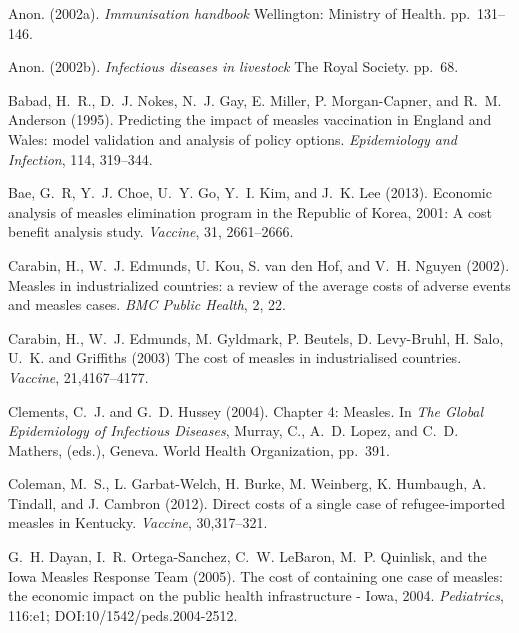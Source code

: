 \documentclass{article}
\begin{document}
\begin{itemize}
\begin{thebibliography}{}
Anon. (2002a).
\newblock \emph{Immunisation handbook}
\newblock Wellington: Ministry of Health. pp.~131--146.

Anon. (2002b).
\newblock \emph{Infectious diseases in livestock}
\newblock The Royal Society. pp.~68.

Babad, H.~R., D.~J. Nokes, N.~J. Gay, E. Miller, P. Morgan-Capner, and R.~M. Anderson (1995).
\newblock Predicting the impact of measles vaccination in England and Wales: model validation and analysis of policy options.
\newblock \emph{Epidemiology and Infection}, 114, 319--344.

Bae, G.~R, Y.~J. Choe, U.~Y. Go, Y.~I. Kim, and J.~K. Lee (2013). 
\newblock Economic analysis of measles elimination program in the Republic of Korea, 2001: A cost benefit analysis study.
\newblock \emph {Vaccine}, 31, 2661--2666.

Carabin, H., W.~J. Edmunds, U. Kou, S. van den Hof, and V.~H. Nguyen (2002). 
\newblock Measles in industrialized countries: a review of the average costs of adverse events and measles cases.
\newblock \emph{BMC Public Health}, 2, 22.

Carabin, H., W.~J. Edmunds, M. Gyldmark, P. Beutels, D. Levy-Bruhl, H. Salo, U.~K. and Griffiths (2003)
\newblock The cost of measles in industrialised countries.
\newblock \emph{Vaccine}, 21,4167--4177.

Clements, C.~J. and G.~D. Hussey (2004).
\newblock Chapter 4: Measles.
\newblock In \emph{The Global Epidemiology of Infectious Diseases},  Murray, C., A.~D. Lopez, and C.~D. Mathers, (eds.), Geneva.
World Health Organization, pp.~391.

Coleman, M.~S., L. Garbat-Welch, H. Burke, M. Weinberg, K. Humbaugh, A. Tindall, and J. Cambron (2012).
\newblock Direct costs of a single case of refugee-imported measles in Kentucky.
\newblock \emph{Vaccine}, 30,317--321.

G.~H. Dayan, I.~R. Ortega-Sanchez, C.~W. LeBaron, M.~P. Quinlisk, and the Iowa Measles Response Team (2005).
\newblock The cost of containing one case of measles: the economic impact on the public health infrastructure - Iowa, 2004.
\newblock \emph{Pediatrics}, 116:e1; DOI:10/1542/peds.2004-2512.


\end{thebibliography}
\end{itemize}
\end{document}
